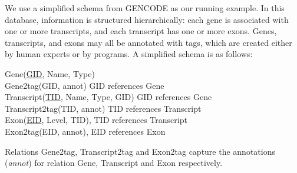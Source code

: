 We use a simplified schema from GENCODE as our running example. In this database, information is structured hierarchically: each gene is associated with one or more transcripts, and each transcript has one or more exons. Genes, transcripts, and exons may all be annotated with tags, which are created either by human experts or by programs. A simplified schema is as follows:
\vspace*{-0.1cm}
\begin{tabbing}
Gene(\underline{GID}, Name, Type)\\
Gene2tag(GID, annot) GID references Gene\\
Transcript(\underline{TID}, Name, Type, GID) GID references Gene\\
Transcript2tag(TID, annot) TID references Transcript\\
Exon(\underline{EID}, Level, TID), TID references Transcript\\
Exon2tag(EID, annot), EID references Exon
\end{tabbing}
Relations Gene2tag, Transcript2tag and Exon2tag capture the annotations ({\em annot}) for relation Gene, Transcript and Exon respectively. 


